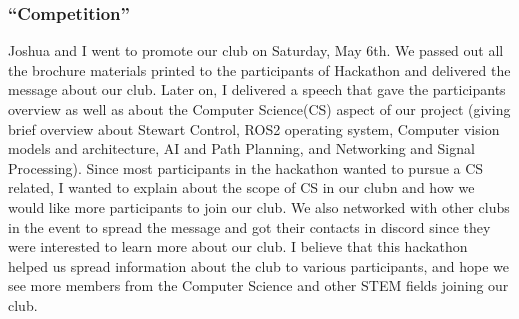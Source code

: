\documentclass[a4paper, 10pt]{article}
\begin{document}
\subsubsection{``Competition''}
Joshua and I went to promote our club on Saturday, May 6th. We passed out all the brochure materials printed to the participants of Hackathon and delivered the message about our club. Later on, I delivered a speech that gave the participants overview as well as about the Computer Science(CS) aspect of our project (giving brief overview about Stewart Control, ROS2 operating system, Computer vision models and architecture, AI and Path Planning, and Networking and Signal Processing). Since most participants in the hackathon wanted to pursue a CS related, I wanted to explain about the scope of CS in our clubn and how we would like more participants to join our club. We also networked with other clubs in the event to spread the message and got their contacts in discord since they were interested to learn more about our club. I believe that this hackathon helped us spread information about the club to various participants, and hope we see more members from the Computer Science and other STEM fields joining our club.
\end{document}
